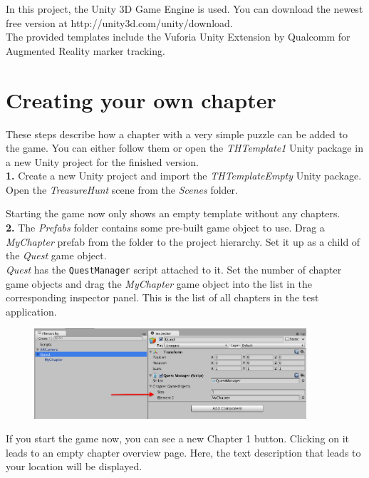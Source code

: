 \documentclass[a4paper]{article}
\begin{document}
In this project, the Unity 3D Game Engine is used. You can download the newest free version at http://unity3d.com/unity/download.\\

The provided templates include the Vuforia Unity Extension by Qualcomm for Augmented Reality marker tracking.

\newpage

\section{Creating your own chapter}

These steps describe how a chapter with a very simple puzzle can be added to the game. You can either follow them or open the \textit{THTemplate1} Unity package in a new Unity project for the finished version.\\

\textbf{1.} Create a new Unity project and import the \textit{THTemplateEmpty} Unity package. Open the \textit{TreasureHunt} scene from the \textit{Scenes} folder.
	
Starting the game now only shows an empty template without any chapters.\\
	
\textbf{2.} The \textit{Prefabs} folder contains some pre-built game object to use. Drag a \textit{MyChapter} prefab from the folder to the project hierarchy. Set it up as a child of the \textit{Quest} game object.\\
	
\textit{Quest} has the \texttt{QuestManager} script attached to it. Set the number of chapter game objects and drag the \textit{MyChapter} game object into the list in the corresponding inspector panel. This is the list of all chapters in the test application.\\
	
\begin{figure}[h]
\centering
\includegraphics[width=0.9\textwidth]{figures/2-1.png}
\end{figure}
	
If you start the game now, you can see a new Chapter 1 button. Clicking on it leads to an empty chapter overview page. Here, the text description that leads to your location will be displayed.
	
\end{document}
